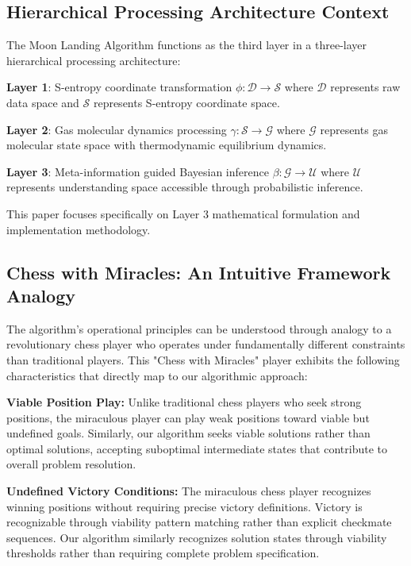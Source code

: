 \documentclass[12pt,a4paper]{article}
\begin{document}
\subsection{Hierarchical Processing Architecture Context}

The Moon Landing Algorithm functions as the third layer in a three-layer hierarchical processing architecture:

\textbf{Layer 1}: S-entropy coordinate transformation $\phi: \mathcal{D} \to \mathcal{S}$ where $\mathcal{D}$ represents raw data space and $\mathcal{S}$ represents S-entropy coordinate space.

\textbf{Layer 2}: Gas molecular dynamics processing $\gamma: \mathcal{S} \to \mathcal{G}$ where $\mathcal{G}$ represents gas molecular state space with thermodynamic equilibrium dynamics.

\textbf{Layer 3}: Meta-information guided Bayesian inference $\beta: \mathcal{G} \to \mathcal{U}$ where $\mathcal{U}$ represents understanding space accessible through probabilistic inference.

This paper focuses specifically on Layer 3 mathematical formulation and implementation methodology.

\subsection{Chess with Miracles: An Intuitive Framework Analogy}

The algorithm's operational principles can be understood through analogy to a revolutionary chess player who operates under fundamentally different constraints than traditional players. This "Chess with Miracles" player exhibits the following characteristics that directly map to our algorithmic approach:

\textbf{Viable Position Play:} Unlike traditional chess players who seek strong positions, the miraculous player can play weak positions toward viable but undefined goals. Similarly, our algorithm seeks viable solutions rather than optimal solutions, accepting suboptimal intermediate states that contribute to overall problem resolution.

\textbf{Undefined Victory Conditions:} The miraculous chess player recognizes winning positions without requiring precise victory definitions. Victory is recognizable through viability pattern matching rather than explicit checkmate sequences. Our algorithm similarly recognizes solution states through viability thresholds rather than requiring complete problem specification.
\end{document}
